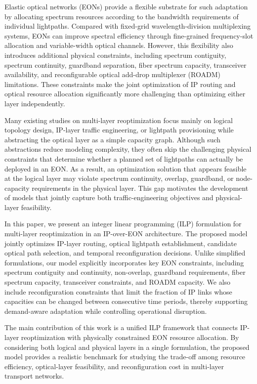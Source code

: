 \documentclass[conference]{IEEEtran}
\begin{document}
Elastic optical networks (EONs) provide a flexible substrate for such adaptation by allocating spectrum resources according to the bandwidth requirements of individual lightpaths. Compared with fixed-grid wavelength-division multiplexing systems, EONs can improve spectral efficiency through fine-grained frequency-slot allocation and variable-width optical channels. However, this flexibility also introduces additional physical constraints, including spectrum contiguity, spectrum continuity, guardband separation, fiber spectrum capacity, transceiver availability, and reconfigurable optical add-drop multiplexer (ROADM) limitations. These constraints make the joint optimization of IP routing and optical resource allocation significantly more challenging than optimizing either layer independently.

Many existing studies on multi-layer reoptimization focus mainly on logical topology design, IP-layer traffic engineering, or lightpath provisioning while abstracting the optical layer as a simple capacity graph. Although such abstractions reduce modeling complexity, they often skip the challenging physical constraints that determine whether a planned set of lightpaths can actually be deployed in an EON. As a result, an optimization solution that appears feasible at the logical layer may violate spectrum continuity, overlap, guardband, or node-capacity requirements in the physical layer. This gap motivates the development of models that jointly capture both traffic-engineering objectives and physical-layer feasibility.

In this paper, we present an integer linear programming (ILP) formulation for multi-layer reoptimization in an IP-over-EON architecture. The proposed model jointly optimizes IP-layer routing, optical lightpath establishment, candidate optical path selection, and temporal reconfiguration decisions. Unlike simplified formulations, our model explicitly incorporates key EON constraints, including spectrum contiguity and continuity, non-overlap, guardband requirements, fiber spectrum capacity, transceiver constraints, and ROADM capacity. We also include reconfiguration constraints that limit the fraction of IP links whose capacities can be changed between consecutive time periods, thereby supporting demand-aware adaptation while controlling operational disruption.

The main contribution of this work is a unified ILP framework that connects IP-layer reoptimization with physically constrained EON resource allocation. By considering both logical and physical layers in a single formulation, the proposed model provides a realistic benchmark for studying the trade-off among resource efficiency, optical-layer feasibility, and reconfiguration cost in multi-layer transport networks.
\end{document}
